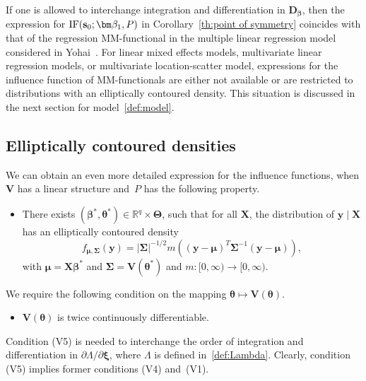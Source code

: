 \documentclass{article}
\numberwithin{equation}{section}
\theoremstyle{plain}
\newcommand{\R}{\mathbb{R}}
\newcommand{\bbeta}{\bm\beta}
\newcommand{\btheta}{\bm\theta}
\newcommand{\bxi}{\bm\xi}
\newcommand{\bmu}{\bm\mu}
\newcommand{\bSigma}{\mathbf{\Sigma}}
\newcommand{\bTheta}{\bm\Theta}
\newcommand{\by}{\mathbf{y}}
\newcommand{\bs}{\mathbf{s}}
\newcommand{\bX}{\mathbf{X}}
\newcommand{\bV}{\mathbf{V}}
\newcommand{\bD}{\mathbf{D}}
\begin{document}
If one is allowed to interchange integration and differentiation in $\bD_{\bbeta}$, then
the expression for $\text{\rm IF}(\bs_0;\bbeta_1,P)$ in Corollary~\ref{th:point of symmetry}
coincides with that of the regression MM-functional in the multiple linear regression model considered in 
Yohai~\cite{yohai1987}.
For linear mixed effects models, multivariate linear regression models, or multivariate location-scatter model, 
expressions for the influence function of MM-functionals are either not available
or are restricted to distributions with an elliptically contoured density.
This situation is discussed in the next section for model~\eqref{def:model}.

\subsection{Elliptically contoured densities}
\label{subsec:IF elliptical}
We can obtain an even more detailed expression for the influence functions,
when $\bV$ has a linear structure and~$P$ has the following property.
\begin{itemize}
\item[(E)]
There exists $(\bbeta^*,\btheta^*)\in\R^q\times\bTheta$,
such that for all $\bX$, the distribution of $\by\mid\bX$ has an elliptically contoured density
\begin{equation}
\label{eq:elliptical}
f_{\bmu,\bSigma}(\by)
=
|\bSigma|^{-1/2}
m\left(
(\by-\bmu)^T
\bSigma^{-1}
(\by-\bmu)
\right),
\end{equation}
with $\bmu=\bX\bbeta^*$ and $\bSigma=\bV(\btheta^*)$ and $m:[0,\infty)\to[0,\infty)$.
\end{itemize}
We require the following condition on the mapping $\btheta\mapsto\bV(\btheta)$.
\begin{itemize}
\item[(V5)]
$\bV(\btheta)$ is twice continuously differentiable.
\end{itemize}
Condition (V5) is needed to
interchange the order of integration and differentiation in $\partial\Lambda/\partial\bxi$,
where $\Lambda$ is defined in~\eqref{def:Lambda}.
Clearly, condition (V5) implies former conditions (V4) and~(V1).
\end{document}
